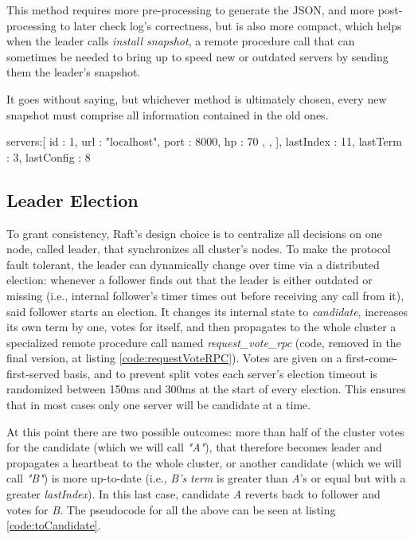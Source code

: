 This method requires more pre-processing to generate the JSON, and more post-processing to later check log's correctness, but is also more compact, which helps when the leader calls \textit{install snapshot}, a remote procedure call that can sometimes be needed to bring up to speed new or outdated servers by sending them the leader's snapshot. 

It goes without saying, but whichever method is ultimately chosen, every new snapshot must comprise all information contained in the old ones.

\begin{python}[label={code:snapJson}, caption={The JSON for a snapshot that saves cluster's state would look something like this}]
{
    servers:[
        {
            id : 1,
            url : "localhost",
            port : 8000,
            hp : 70
        },
        {}, {}
    ],
    lastIndex : 11,
    lastTerm : 3,
    lastConfig : 8
}
\end{python}

\subsection{Leader Election}

To grant consistency, Raft's design choice is to centralize all decisions on one node, called leader, that synchronizes all cluster's nodes. To make the protocol fault tolerant, the leader can dynamically change over time via a distributed election: whenever a follower finds out that the leader is either outdated or missing (i.e., internal follower's timer times out before receiving any call from it), said follower starts an election. It changes its internal state to \textit{candidate}, increases its own term by one, votes for itself, and then propagates to the whole cluster a specialized remote procedure call named \textit{request\_vote\_rpc} (code, removed in the final version, at listing \ref{code:requestVoteRPC}). Votes are given on a first-come-first-served basis, and to prevent split votes each server's election timeout is randomized between 150ms and 300ms at the start of every election. This ensures that in most cases only one server will be candidate at a time.

At this point there are two possible outcomes: more than half of the cluster votes for the candidate (which we will call \textit{"A"}), that therefore becomes leader and propagates a heartbeat to the whole cluster, or another candidate (which we will call \textit{"B"}) is more up-to-date (i.e., \textit{B's} \textit{term} is greater than \textit{A}'s or equal but with a greater \textit{lastIndex}). In this last case, candidate \textit{A} reverts back to follower and votes for \textit{B}. The pseudocode for all the above can be seen at listing \ref{code:toCandidate}.

